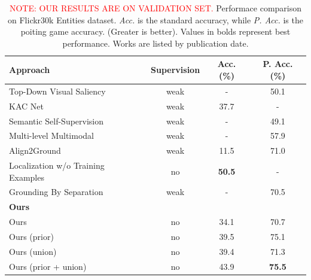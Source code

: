 \documentclass{article}
\begin{document}
\begin{table}
  \centering
  \bgroup
  \resizebox{\textwidth}{!} {%
  \begin{tabular}{lccc}
    \toprule
    \textbf{Approach} & \textbf{Supervision} & \textbf{Acc. (\%)} & \textbf{P. Acc. (\%)} \\
    \midrule
    Top-Down Visual Saliency \cite{ramanishka2017top}        & weak & -    & 50.1 \\
    KAC Net \cite{chen2018knowledge}                         & weak & 37.7 & -    \\
    Semantic Self-Supervision \cite{javed2018learning}       & weak & -    & 49.1 \\
    Multi-level Multimodal \cite{akbari2019multi}            & weak & -    & 57.9 \\
    Align2Ground \cite{datta2019align2ground}                & weak & 11.5 & 71.0 \\
    Localization w/o Training Examples \cite{wang2019phrase} & no   & \textbf{50.5} & -    \\
    Grounding By Separation \cite{arbelle2021detector}       & weak & -    & 70.5 \\
    \midrule
    \multicolumn{4}{l}{\textbf{Ours}} \\
    Ours                                                     & no   & 34.1 & 70.7 \\
    Ours (prior)                                             & no   & 39.5 & 75.1 \\
    Ours (union)                                             & no   & 39.4 & 71.3 \\
    Ours (prior + union)                                     & no   & 43.9 & \textbf{75.5} \\
    \bottomrule
  \end{tabular}
  }
  \egroup
  \caption{%
    \textcolor{red}{NOTE: OUR RESULTS ARE ON VALIDATION
     SET.}\protect\footnotemark \hspace{0.5cm}
     Performace comparison on Flickr30k Entities dataset.
     \textit{Acc.} is the standard accuracy, while \textit{P. Acc.} is
     the poiting game accuracy. (Greater is better). Values in bolds
     represent best performance. Works are listed by publication
     date.
    }
  \label{tab:results-flickr30k}
\end{table}
\end{document}
